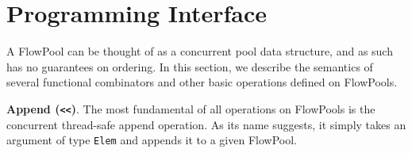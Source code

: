 \documentclass[runningheads,a4paper]{llncs}
\begin{document}



\section{Programming Interface}
\label{sec:programming-interface}

A FlowPool can be thought of as a concurrent pool data structure, and as such
has no guarantees on ordering. In this section, we describe the semantics of
several functional combinators and other basic operations defined on
FlowPools.

\textbf{Append (\texttt{<<})}. The most fundamental of all
operations on FlowPools is the concurrent thread-safe append operation.
As its name suggests, it
simply takes an argument of type \texttt{Elem} and appends it to a given
FlowPool. 

\end{document}
